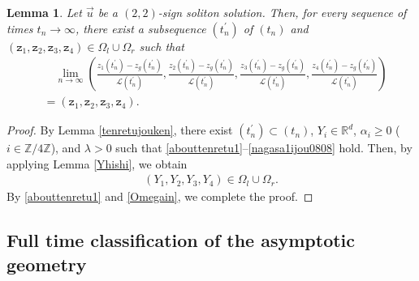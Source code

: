 \documentclass[reqno]{amsart}
\theoremstyle{plain}
\newtheorem{lemma}[theorem]{Lemma}
\theoremstyle{definition}
\numberwithin{equation}{section}
\begin{document}
\begin{lemma}\label{sequencerough}
Let $\vec{u}$ be a $(2,2)$-sign soliton solution. Then, for every sequence of times $t_n\to\infty$, there exist a subsequence $(t_n^{\prime})$ of $(t_n)$ and $\left(\mathtt{z}_1,\mathtt{z}_2,\mathtt{z}_3,\mathtt{z}_4\right)\in \Omega_l\cup \Omega_r$ such that
\begin{align*}
&\quad\lim_{n\to\infty}\left(\frac{z_1(t_n^{\prime})-z_g(t_n^{\prime})}{\mathcal{L}(t_n^{\prime})},\frac{z_2(t_n^{\prime})-z_g(t_n^{\prime})}{\mathcal{L}(t_n^{\prime})},\frac{z_3(t_n^{\prime})-z_g(t_n^{\prime})}{\mathcal{L}(t_n^{\prime})},\frac{z_4(t_n^{\prime})-z_g(t_n^{\prime})}{\mathcal{L}(t_n^{\prime})}\right)
\\
&=\left(\mathtt{z}_1,\mathtt{z}_2,\mathtt{z}_3,\mathtt{z}_4\right).
\end{align*}
\end{lemma}

\begin{proof}
By Lemma \ref{tenretujouken}, there exist $(t_n^{\prime})\subset (t_n)$, $Y_i\in\mathbb{R}^d$, $\alpha_i\geq 0$ ($i\in\mathbb{Z}/4\mathbb{Z}$), and $\lambda>0$ such that \eqref{abouttenretu1}--\eqref{nagasa1ijou0808} hold. Then, by applying Lemma \ref{Yhishi}, we obtain
\begin{align}\label{Omegain}
(Y_1,Y_2,Y_3,Y_4)\in \Omega_l\cup \Omega_r.
\end{align}
By \eqref{abouttenretu1} and \eqref{Omegain}, we complete the proof.
\end{proof}


\subsection{Full time classification of the asymptotic geometry}
\end{document}
